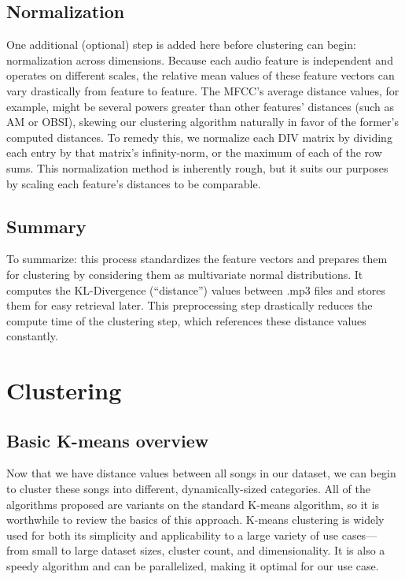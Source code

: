 \documentclass[10pt,twocolumn]{article}
\begin{document}
\subsection{Normalization}

One additional (optional) step is added here before clustering can begin: normalization across dimensions. Because each audio feature is independent and operates on different scales, the relative mean values of these feature vectors can vary drastically from feature to feature. The MFCC’s average distance values, for example, might be several powers greater than other features’ distances (such as AM or OBSI), skewing our clustering algorithm naturally in favor of the former’s computed distances. To remedy this, we normalize each DIV matrix by dividing each entry by that matrix’s infinity-norm, or the maximum of each of the row sums. \cite{Rudin} This normalization method is inherently rough, but it suits our purposes by scaling each feature’s distances to be comparable.

\subsection{Summary}

To summarize: this process standardizes the feature vectors and prepares them for clustering by considering them as multivariate normal distributions. It computes the KL-Divergence (“distance”) values between .mp3 files and stores them for easy retrieval later. This preprocessing step drastically reduces the compute time of the clustering step, which references these distance values constantly.


\section{Clustering}
\label{sec:clustering}

\subsection{Basic K-means overview}

Now that we have distance values between all songs in our dataset, we can begin to cluster these songs into different, dynamically-sized categories. All of the algorithms proposed are variants on the standard K-means algorithm, so it is worthwhile to review the basics of this approach. K-means clustering is widely used for both its simplicity and applicability to a large variety of use cases— from small to large dataset sizes, cluster count, and dimensionality. It is also a speedy algorithm and can be parallelized, making it optimal for our use case.
\end{document}
